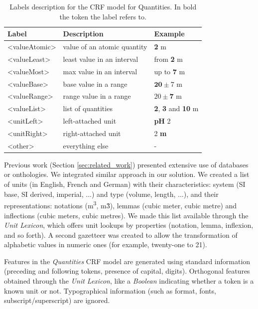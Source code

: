 \documentclass[sigconf]{acmart}
\begin{document}
\begin{table}[ht]
  \caption{Labels description for the CRF model for Quantities. In bold the token the label refers to.}
  \label{tab:quantities-model-labels}
  \begin{tabular}{lll}
    \toprule
    Label & Description & Example\\
    \midrule
    <valueAtomic> & value of an atomic quantity & \textbf{2} m \\
    <valueLeast> & least value in an interval & from \textbf{2} m \\
    <valueMost> & max value in an interval & up to \textbf{7} m \\
    <valueBase> & base value in a range & $\textbf{20}\pm7$ m \\
    <valueRange> & range value in a range & $20 \pm \textbf{7}$ m \\
    <valueList> & list of quantities & \textbf{2}, \textbf{3} and \textbf{10} m \\
    <unitLeft> & left-attached unit & \textbf{pH} 2 \\
    <unitRight> & right-attached unit & 2 \textbf{m} \\
    <other> & everything else & - \\
  \bottomrule
\end{tabular}
\end{table}

Previous work (Section \ref{sec:related_work}) presented extensive use of databases or onthologies. We integrated similar approach in our solution. We created a list of units (in English, French and German) with their characteristics: system (SI base, SI derived, imperial, ...) and type (volume, length, ...), and their representations: notations (m\textsuperscript{3}, m\^3), lemmas (cubic meter, cubic metre) and inflections (cubic meters, cubic metres). We made this list available through the \textit{Unit Lexicon}, which offers unit lookups by properties (notation, lemma, inflexion, and so forth). A second gazetteer was created to allow the transformation of alphabetic values in numeric ones (for example, twenty-one to 21).

Features in the \textit{Quantities} CRF model are generated using standard information (preceding and following tokens, presence of capital, digits). Orthogonal features obtained through the \textit{Unit Lexicon}, like a \textit{Boolean} indicating whether a token is a known unit or not. Typographical information (such as format, fonts, subscript/superscript) are ignored. 
\end{document}
